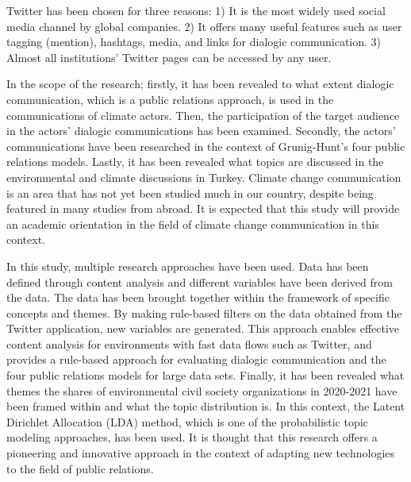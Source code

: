 \documentclass[
]{book}
\begin{document}
Twitter has been chosen for three reasons: 1) It is the most widely used social media channel by global companies. 2) It offers many useful features such as user tagging (mention), hashtags, media, and links for dialogic communication. 3) Almost all institutions' Twitter pages can be accessed by any user.

In the scope of the research; firstly, it has been revealed to what extent dialogic communication, which is a public relations approach, is used in the communications of climate actors. Then, the participation of the target audience in the actors' dialogic communications has been examined. Secondly, the actors' communications have been researched in the context of Grunig-Hunt's four public relations models. Lastly, it has been revealed what topics are discussed in the environmental and climate discussions in Turkey. Climate change communication is an area that has not yet been studied much in our country, despite being featured in many studies from abroad. It is expected that this study will provide an academic orientation in the field of climate change communication in this context.

In this study, multiple research approaches have been used. Data has been defined through content analysis and different variables have been derived from the data. The data has been brought together within the framework of specific concepts and themes. By making rule-based filters on the data obtained from the Twitter application, new variables are generated. This approach enables effective content analysis for environments with fast data flows such as Twitter, and provides a rule-based approach for evaluating dialogic communication and the four public relations models for large data sets. Finally, it has been revealed what themes the shares of environmental civil society organizations in 2020-2021 have been framed within and what the topic distribution is. In this context, the Latent Dirichlet Allocation (LDA) method, which is one of the probabilistic topic modeling approaches, has been used. It is thought that this research offers a pioneering and innovative approach in the context of adapting new technologies to the field of public relations.
\end{document}
